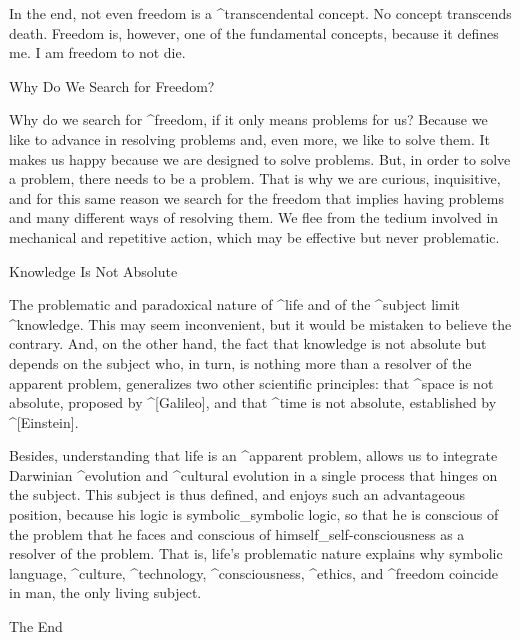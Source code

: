 In the end, not even freedom is a ^{transcendental concept}. No concept
transcends death. Freedom is, however, one of the fundamental concepts,
because it defines me. I am freedom to not die.


\Section Why Do We Search for Freedom?

Why do we search for ^{freedom}, if it only means problems for us?
Because we like to advance in resolving problems and, even more, we like
to solve them. It makes us happy because we are designed to solve
problems. But, in order to solve a problem, there needs to be a problem.
That is why we are curious, inquisitive, and for this same reason we
search for the freedom that implies having problems and many different
ways of resolving them. We flee from the tedium involved in mechanical
and repetitive action, which may be effective but never problematic.


\Section Knowledge Is Not Absolute

The problematic and paradoxical nature of ^{life} and of the ^{subject}
limit ^{knowledge}. This may seem inconvenient, but it would be mistaken
to believe the contrary. And, on the other hand, the fact that knowledge
is not absolute but depends on the subject who, in turn, is nothing more
than a resolver of the apparent problem, generalizes two other
scientific principles: that ^{space} is not absolute, proposed by
^[Galileo], and that ^{time} is not absolute, established by
^[Einstein].

Besides, understanding that life is an ^{apparent problem}, allows us to
integrate Darwinian ^{evolution} and ^{cultural evolution} in a single
process that hinges on the subject. This subject is thus defined, and
enjoys such an advantageous position, because his logic is
symbolic_{symbolic logic}, so that he is conscious of the problem that
he faces and conscious of himself_{self-consciousness} as a resolver of
the problem. That is, life's problematic nature explains why symbolic
language, ^{culture}, ^{technology}, ^{consciousness}, ^{ethics}, and
^{freedom} coincide in man, the only living subject.

\baselineskip
\centerline{\fonttwo The End}

\endinput
